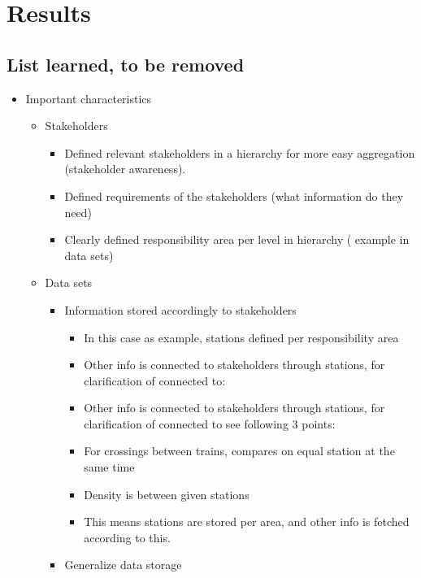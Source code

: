 
\chapter{Results}
\label{chapter:results}

\section{List learned, to be removed} %
\label{sec:list_learned_to_be_removed}

\begin{itemize}
	\item Important characteristics
	\begin{itemize}
		\item Stakeholders 
		\begin{itemize}
			\item Defined relevant stakeholders in a hierarchy for more easy 
			aggregation (stakeholder awareness).
			\item Defined requirements of the stakeholders (what information 
			do they need)
			\item Clearly defined responsibility area per level in hierarchy (
			example in data sets)
		\end{itemize}
		\item Data sets
		\begin{itemize}
			\item Information stored accordingly to stakeholders
			\begin{itemize}
				\item In this case as example, stations defined per 
				responsibility area
				\item Other info is connected to stakeholders through
				stations, for clarification of connected to:
				\item Other info is connected to stakeholders through stations, for clarification of connected to
				see following 3 points:
				\item For crossings between trains, compares on equal 
				station at the same time
				\item Density is between given stations
				\item This means stations are stored per area, and other 
				info is fetched according to this.
			\end{itemize}
			\item Generalize data storage
			\begin{itemize}

\end{itemize}
\end{itemize}
\end{itemize}
\end{itemize}
